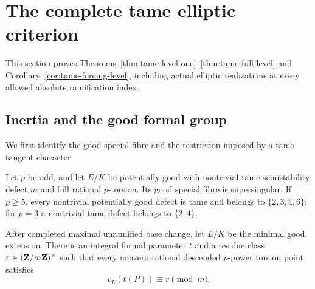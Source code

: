 \section{The complete tame elliptic criterion}\label{sec:tame-full-torsion}
This section proves Theorems~\ref{thm:tame-level-one}--\ref{thm:tame-full-level} and Corollary~\ref{cor:tame-forcing-level}, including actual elliptic realizations at every allowed absolute ramification index.

\subsection{Inertia and the good formal group}
We first identify the good special fibre and the restriction imposed by a tame tangent character.

\begin{lemma}\label{tf-lem:inertia}
Let $p$ be odd, and let $E/K$ be potentially good with nontrivial tame semistability defect $m$ and full rational $p$-torsion. Its good special fibre is supersingular. If $p\ge5$, every nontrivial potentially good defect is tame and belongs to $\{2,3,4,6\}$; for $p=3$ a nontrivial tame defect belongs to $\{2,4\}$.

After completed maximal unramified base change, let $L/K$ be the minimal good extension. There is an integral formal parameter $t$ and a residue class $r\in(\mathbf Z/m\mathbf Z)^\times$ such that every nonzero rational descended $p$-power torsion point satisfies
\begin{equation}\label{tf-eq:congruence}
 v_L(t(P))\equiv r\pmod m.
\end{equation}
\end{lemma}

